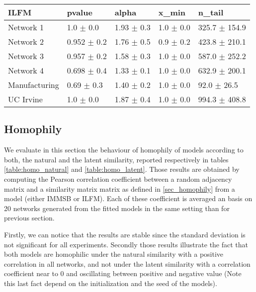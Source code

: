 \documentclass[a4paper, 12pt]{article}
\begin{document}
\begin{table}
    \begin{tabular}{lllll}
    \hline
        \textbf{ILFM} & pvalue          & alpha           & x\_min           & n\_tail              \\
    \hline
    Network 1     & 1.0 $\pm$ 0.0     & 1.93 $\pm$ 0.3  & 1.0 $\pm$ 0.0     & 325.7 $\pm$ 154.9 \\
    Network 2     & 0.952 $\pm$ 0.2 & 1.76 $\pm$ 0.5 & 0.9 $\pm$ 0.2 & 423.8 $\pm$ 210.1  \\
    Network 3     & 0.957 $\pm$ 0.2 & 1.58 $\pm$ 0.3 & 1.0 $\pm$ 0.0     & 587.0 $\pm$ 252.2 \\
    Network 4     & 0.698 $\pm$ 0.4 & 1.33 $\pm$ 0.1 & 1.0 $\pm$ 0.0     & 632.9 $\pm$ 200.1  \\
    Manufacturing & 0.69 $\pm$ 0.3   & 1.40 $\pm$ 0.2 & 1.0 $\pm$ 0.0     & 92.0 $\pm$ 26.5     \\
    UC Irvine     & 1.0 $\pm$ 0.0     & 1.87 $\pm$ 0.4   & 1.0 $\pm$ 0.0     & 994.3 $\pm$ 408.8 \\
\hline
\end{tabular}


\end{table}

\subsection{Homophily}

We evaluate in this section the behaviour of homophily of models according to both, the natural and the latent similarity, reported respectively in tables \ref{table:homo_natural} and \ref{table:homo_latent}. Those results are obtained by computing the Pearson correlation coefficient between a random adjacency matrix and a similarity matrix matrix as defined in \ref{sec_homophily} from a model (either IMMSB or ILFM). Each of these coefficient is averaged an basis on 20 networks generated from the fitted models in the same setting than for previous section.

Firstly, we can notice that the results are stable since the standard deviation is not significant for all experiments. Secondly those results illustrate the fact that both models are homophilic under the natural similarity with a positive correlation in all networks,  and not under the latent similarity with a correlation coefficient near to 0 and oscillating between positive and negative value (Note this last fact depend on the initialization and the seed of the models).
\end{document}
